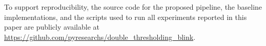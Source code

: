 To support reproducibility, the source code for the proposed pipeline, the baseline implementations, and the scripts used to run all experiments reported in this paper are publicly available at \url{https://github.com/pyresearchs/double_thresholding_blink}.
